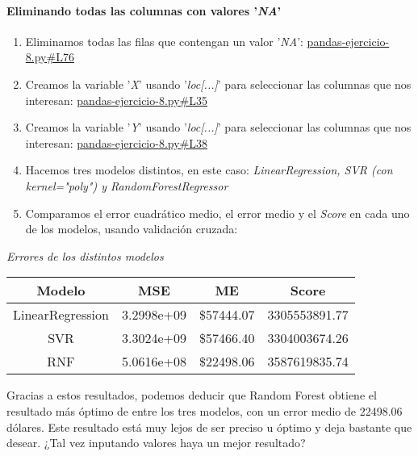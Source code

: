 \documentclass[
12pt, 
spanish, 
singlespacing,
headsepline
]{article}
\begin{document}
\paragraph{Eliminando todas las columnas con valores '\textit{NA}'}
\begin{enumerate}
\item Eliminamos todas las filas que contengan un valor '\textit{NA}': \href{https://github.com/uo272509/InteligenciaNegocioPL/blob/c43eff60b8bcd5372c221600c31fed0eea01aec5/Prac1/Parte\%203/pandas-ejercicio-8.py\#L76}{pandas-ejercicio-8.py\#L76}

\item Creamos la variable '\textit{X}' usando '\textit{loc[...]}' para seleccionar las columnas que nos interesan: \href{https://github.com/uo272509/InteligenciaNegocioPL/blob/c43eff60b8bcd5372c221600c31fed0eea01aec5/Prac1/Parte\%203/pandas-ejercicio-8.py\#L35}{pandas-ejercicio-8.py\#L35}

\item Creamos la variable '\textit{Y}' usando '\textit{loc[...]}' para seleccionar las columnas que nos interesan: \href{https://github.com/uo272509/InteligenciaNegocioPL/blob/c43eff60b8bcd5372c221600c31fed0eea01aec5/Prac1/Parte\%203/pandas-ejercicio-8.py\#L38}{pandas-ejercicio-8.py\#L38}

\item Hacemos tres modelos distintos, en este caso: \textit{LinearRegression, SVR (con kernel="poly") y RandomForestRegressor} 

\item Comparamos el error cuadrático medio, el error medio y el \textit{Score} en cada uno de los modelos, usando validación cruzada:
\end{enumerate}
\begin{center}
\emph{Errores de los distintos modelos}\\
\begin{tabular}{|c|c|c|c|}
\hline 
Modelo & MSE & ME & Score \\ 
\hline 
LinearRegression & 3.2998e+09 & \$57444.07 &  3305553891.77\\ 
\hline 
SVR & 3.3024e+09 & \$57466.40 & 3304003674.26\\ 
\hline 
RNF &5.0616e+08 & \$22498.06 & 3587619835.74 \\ 
\hline 
\end{tabular} 
\end{center}
Gracias a estos resultados, podemos deducir que Random Forest obtiene el resultado más óptimo de entre los tres modelos, con un error medio de 22498.06 dólares. Este resultado está muy lejos de ser preciso u óptimo y deja bastante que desear. ¿Tal vez inputando valores haya un mejor resultado?
\end{document}
